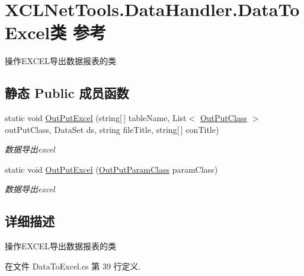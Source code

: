 \hypertarget{class_x_c_l_net_tools_1_1_data_handler_1_1_data_to_excel}{\section{X\-C\-L\-Net\-Tools.\-Data\-Handler.\-Data\-To\-Excel类 参考}
\label{class_x_c_l_net_tools_1_1_data_handler_1_1_data_to_excel}
}


操作\-E\-X\-C\-E\-L导出数据报表的类  


\subsection*{静态 Public 成员函数}
\begin{DoxyCompactItemize}
\item 
static void \hyperlink{class_x_c_l_net_tools_1_1_data_handler_1_1_data_to_excel_ab2355fae5c2f8c39b72472b59dee898b}{Out\-Put\-Excel} (string\mbox{[}$\,$\mbox{]} table\-Name, List$<$ \hyperlink{class_x_c_l_net_tools_1_1_entity_1_1_data_handler_1_1_out_put_class}{Out\-Put\-Class} $>$ out\-Put\-Class, Data\-Set ds, string file\-Title, string\mbox{[}$\,$\mbox{]} con\-Title)
\begin{DoxyCompactList}\small\item\em 数据导出excel \end{DoxyCompactList}\item 
static void \hyperlink{class_x_c_l_net_tools_1_1_data_handler_1_1_data_to_excel_ae9071c256d304ff488e4f603aac980ad}{Out\-Put\-Excel} (\hyperlink{class_x_c_l_net_tools_1_1_entity_1_1_data_handler_1_1_out_put_param_class}{Out\-Put\-Param\-Class} param\-Class)
\begin{DoxyCompactList}\small\item\em 数据导出excel \end{DoxyCompactList}\end{DoxyCompactItemize}


\subsection{详细描述}
操作\-E\-X\-C\-E\-L导出数据报表的类 



在文件 Data\-To\-Excel.\-cs 第 39 行定义.



